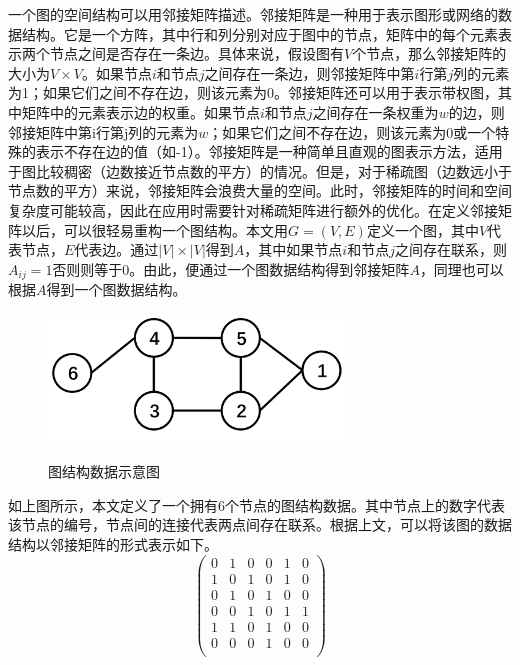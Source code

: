 一个图的空间结构可以用邻接矩阵描述。邻接矩阵是一种用于表示图形或网络的数据结构。它是一个方阵，其中行和列分别对应于图中的节点，矩阵中的每个元素表示两个节点之间是否存在一条边。具体来说，假设图有$V$个节点，那么邻接矩阵的大小为$V \times V$。如果节点$i$和节点$j$之间存在一条边，则邻接矩阵中第$i$行第$j$列的元素为1；如果它们之间不存在边，则该元素为0。邻接矩阵还可以用于表示带权图，其中矩阵中的元素表示边的权重。如果节点$i$和节点$j$之间存在一条权重为$w$的边，则邻接矩阵中第i行第j列的元素为$w$；如果它们之间不存在边，则该元素为0或一个特殊的表示不存在边的值（如-1）。邻接矩阵是一种简单且直观的图表示方法，适用于图比较稠密（边数接近节点数的平方）的情况。但是，对于稀疏图（边数远小于节点数的平方）来说，邻接矩阵会浪费大量的空间。此时，邻接矩阵的时间和空间复杂度可能较高，因此在应用时需要针对稀疏矩阵进行额外的优化。在定义邻接矩阵以后，可以很轻易重构一个图结构。本文用$G=(V,E)$定义一个图，其中$V$代表节点，$E$代表边。通过$\left|V\right| \times \left|V\right|$得到$A$，其中如果节点$i$和节点$j$之间存在联系，则$A_{ij}=1$否则则等于0。由此，便通过一个图数据结构得到邻接矩阵$A$，同理也可以根据$A$得到一个图数据结构。
\begin{figure}[ht]
    \centering
    \includegraphics[width=0.70\textwidth]{FigMa/Graph_structure.png}\\
    \vspace{-0.3cm}
    \caption{图结构数据示意图}
    \label{fig:Graph_structure}
\end{figure}
如上图所示，本文定义了一个拥有6个节点的图结构数据。其中节点上的数字代表该节点的编号，节点间的连接代表两点间存在联系。根据上文，可以将该图的数据结构以邻接矩阵的形式表示如下。
\begin{equation}
\begin{pmatrix}
        0 & 1 & 0 & 0 & 1 & 0 \\
        1 & 0 & 1 & 0 & 1 & 0 \\
        0 & 1 & 0 & 1 & 0 & 0 \\
        0 & 0 & 1 & 0 & 1 & 1 \\
        1 & 1 & 0 & 1 & 0 & 0 \\
        0 & 0 & 0 & 1 & 0 & 0 \\
\end{pmatrix}
\label{equation:adj_mat}
\end{equation}
